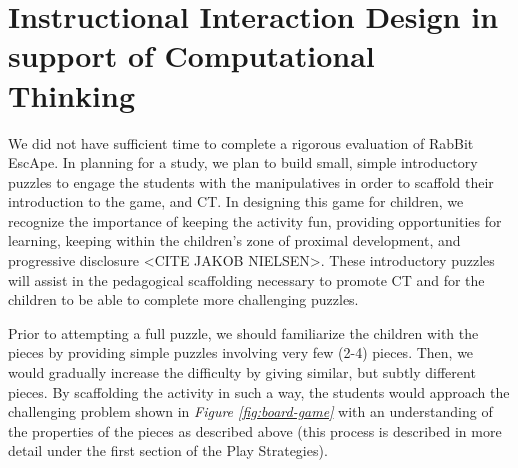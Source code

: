 \documentclass{acm_proc_article-sp}
\begin{document}
\section{Instructional Interaction Design in support of Computational Thinking}
We did not have sufficient time to complete a rigorous evaluation of RabBit EscApe. 
In planning for a study, we plan to build small, simple introductory puzzles to engage the students with the manipulatives in order to scaffold their introduction to the game, and CT. In designing this game for children, we recognize the importance of keeping the activity fun, providing opportunities for learning, keeping within the children's zone of proximal development\cite{vygotsky1987zone}, and progressive disclosure <CITE JAKOB NIELSEN>. These introductory puzzles will assist in the pedagogical scaffolding necessary to promote CT and for the children to be able to complete more challenging puzzles.

Prior to attempting a full puzzle, we should familiarize the children with the pieces by providing simple puzzles involving very few (2-4) pieces. 
Then, we would gradually increase the difficulty by giving similar, but subtly different pieces. 
By scaffolding the activity in such a way, the students would approach the challenging problem shown in {\em Figure \ref{fig:board-game}} with an understanding of the properties of the pieces as described above (this process is described in more detail under the first section of the Play Strategies).
\end{document}
